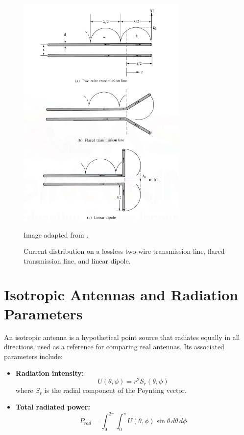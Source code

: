 \begin{figure}[H]
    \centering
    \includegraphics[width=0.75\textwidth]{figures/dipole.png}
    \caption{Current distribution on a lossless two-wire transmission line, flared transmission line, and linear dipole.}
    \small Image adapted from \cite{balanis}.
    \label{fig:dipole-current}
\end{figure}

\section{Isotropic Antennas and Radiation Parameters}

An isotropic antenna is a hypothetical point source that radiates equally in all directions, used as a reference for comparing real antennas. Its associated parameters include:

\begin{itemize}
    \item \textbf{Radiation intensity:}
    \[
    U(\theta,\phi) = r^2 S_r(\theta,\phi)
    \]
    where $S_r$ is the radial component of the Poynting vector.
    \item \textbf{Total radiated power:}
    \[
    P_{rad} = \int_{0}^{2\pi} \int_{0}^{\pi} U(\theta,\phi) \sin\theta \, d\theta \, d\phi
    \]
\end{itemize}

